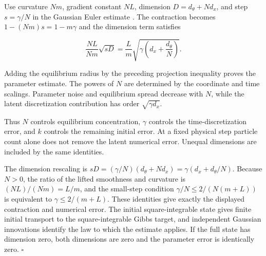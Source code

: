 \documentclass[11pt,a4paper]{report}
\begin{document}
Use curvature \(Nm\), gradient constant \(NL\), dimension \(D=d_\theta+Nd_x\), and step \(s=\gamma/N\) in the Gaussian Euler estimate \cite[Section~3.45.7]{LangevinLean2026ULASC}. The contraction becomes \(1-(Nm)s=1-m\gamma\) and the dimension term satisfies

\[\frac{NL}{Nm}\sqrt{sD}
=\frac Lm\sqrt{\gamma\left(d_x+\frac{d_\theta}{N}\right)}.\]

Adding the equilibrium radius by the preceding projection inequality proves the parameter estimate. The powers of \(N\) are determined by the coordinate and time scalings. Parameter noise and equilibrium spread decrease with \(N\), while the latent discretization contribution has order \(\sqrt{\gamma d_x}\).



Thus \(N\) controls equilibrium concentration, \(\gamma\) controls the time-discretization error, and \(k\) controls the remaining initial error. At a fixed physical step particle count alone does not remove the latent numerical error. Unequal dimensions are included by the same identities.




The dimension rescaling is \(sD=(\gamma/N)(d_\theta+Nd_x)=\gamma(d_x+d_\theta/N)\). Because \(N>0\), the ratio of the lifted smoothness and curvature is \((NL)/(Nm)=L/m\), and the small-step condition \(\gamma/N\le2/(N(m+L))\) is equivalent to \(\gamma\le2/(m+L)\). These identities give exactly the displayed contraction and numerical error. The initial square-integrable state gives finite initial transport to the square-integrable Gibbs target, and independent Gaussian innovations identify the law to which the estimate applies. If the full state has dimension zero, both dimensions are zero and the parameter error is identically zero. \(\square\)
\end{document}
